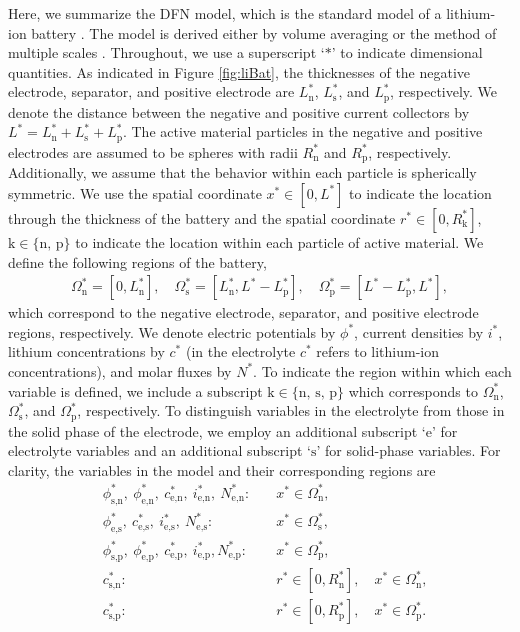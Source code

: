 \documentclass[a4paper]{article}
\newcommand{\ts}[1]{_{\text{#1}}}
\newcommand{\kin}[1]{\text{k} \in \{\text{#1}\}}
\begin{document}
Here, we summarize the DFN model, which is the standard model of a lithium-ion battery \cite{doyle,Fuller1994,newman_book}. The model is derived either by volume averaging \cite{newman_book} or the method of multiple scales \cite{Richardson2011}. Throughout, we use a superscript `$*$' to indicate dimensional quantities. As indicated in Figure \ref{fig:liBat}, the thicknesses of the negative electrode, separator, and positive electrode are $L^*\ts{n}$, $L\ts{s}^*$, and $L\ts{p}^*$, respectively. We denote the distance between the negative and positive current collectors by $L^*=L\ts{n}^*+L\ts{s}^*+L\ts{p}^*$. The active material particles in the negative and positive electrodes are assumed to be spheres with radii $R\ts{n}^*$ and $R\ts{p}^*$, respectively. Additionally, we assume that the behavior within each particle is spherically symmetric. We use the spatial coordinate $x^*\in[0,L^*]$ to indicate the location through the thickness of the battery and the spatial coordinate $r^*\in[0,R\ts{k}^*]$, $\kin{n, p}$ to indicate the location within each particle of active material. We define the following regions of the battery,
\begin{align*}
    \Omega^*\ts{n} = [0, L\ts{n}^*],             \quad
    \Omega^*\ts{s} = [L\ts{n}^*, L^*-L\ts{p}^*], \quad
    \Omega^*\ts{p} = [L^*-L\ts{p}^*, L^*],
\end{align*}
which correspond to the negative electrode, separator, and positive electrode regions, respectively. We denote electric potentials by $\phi^*$, current densities by $i^*$, lithium concentrations by $c^*$ (in the electrolyte $c^*$ refers to lithium-ion concentrations), and molar fluxes by $N^*$. To indicate the region within which each variable is defined, we include a subscript $\kin{n, s, p}$ which corresponds to $\Omega^*\ts{n}$, $\Omega^*\ts{s}$, and $\Omega^*\ts{p}$, respectively. To distinguish variables in the electrolyte from those in the solid phase of the electrode, we employ an additional subscript `$\text{e}$' for electrolyte variables and an additional subscript `$\text{s}$' for solid-phase variables. For clarity, the variables in the model and their corresponding regions are
\begin{align*}
   & \phi\ts{s,n}^*, \ \phi\ts{e,n}^*, \ c\ts{e,n}^*, \ i\ts{e,n}^*, \ N\ts{e,n}^*: \quad & x^*\in \Omega\ts{n}^*,                         \\
   & \phi\ts{e,s}^*, \ c\ts{e,s}^*, \ i\ts{e,s}^*, \ N\ts{e,s}^*: \quad                      & x^*\in \Omega\ts{s}^*,                         \\
   & \phi\ts{s,p}^*, \ \phi\ts{e,p}^*, \ c\ts{e,p}^*, \ i\ts{e,p}^*, N\ts{e,p}^*: \quad   & x^*\in \Omega\ts{p}^*,                         \\
   & c\ts{s,n}^*:                                                                      & r^*\in[0, R\ts{n}^*], \quad x^*\in \Omega\ts{n}^*, \\
   & c\ts{s,p}^*:                                                                      & r^*\in[0, R\ts{p}^*], \quad x^*\in \Omega\ts{p}^*.
\end{align*}
\end{document}
